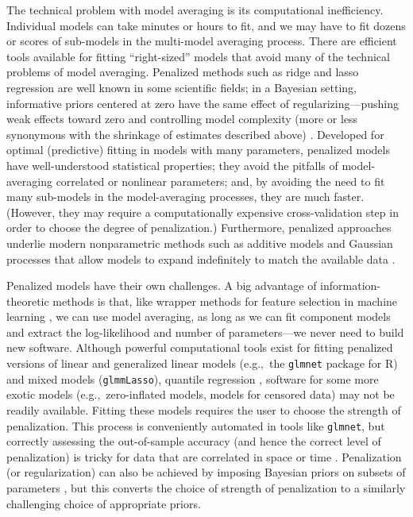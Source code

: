 \documentclass[entropy,article,accept,pdftex,moreauthors]{Definitions/mdpi}
\begin{document}
The technical problem with model averaging is its computational
inefficiency. Individual models can take minutes or hours to fit, and we
may have to fit dozens or scores of sub-models in the multi-model
averaging process. There are efficient tools available for fitting
``right-sized'' models that avoid many of the technical problems of
model averaging. Penalized methods such as ridge and lasso regression
\cite{ref-dahlgren_alternative_2010} are well known in some scientific fields; in a Bayesian
setting, informative priors centered at zero have the same effect of
 regularizing---pushing weak effects toward zero and controlling
model complexity (more or less synonymous with the {shrinkage} of
estimates described above) \cite{ref-lemoineMoving2019a}. Developed for optimal
(predictive) fitting in models with many parameters, penalized models
have well-understood statistical properties; they avoid the pitfalls of
model-averaging correlated or nonlinear parameters; and, by avoiding the
need to fit many sub-models in the model-averaging processes, they are
much faster. (However, they may require a computationally
  expensive cross-validation step in order to choose the degree of
  penalization.) %
Furthermore, penalized approaches underlie modern
nonparametric methods such as additive models and Gaussian processes
that allow models to expand indefinitely to match the available data
\cite{ref-rasmussenGaussian2005,ref-woodGeneralized2017}.

Penalized models have their own challenges. A big advantage of
information-theoretic methods is that, like wrapper methods for feature
selection in machine learning \cite{ref-chandrashekarSurvey2014}, we can use
model averaging, as long as we can fit component models and extract the
log-likelihood and number of parameters---we never need to build new
software. Although powerful computational tools exist for fitting
penalized versions of linear and generalized linear models (e.g.,~the
\texttt{{glmnet}} package for R) and mixed models (\texttt{glmmLasso}),
quantile regression \cite{ref-koenkerQuantile2017}, software for some more exotic models
(e.g.,~zero-inflated models, models for censored data) may not be readily
available. Fitting these models requires the user to choose the strength
of penalization. This process is conveniently automated in tools like
\texttt{glmnet}, but correctly assessing the out-of-sample accuracy (and
hence the correct level of penalization) is tricky for data that are
correlated in space or time \cite{ref-wenger_assessing_2012,ref-robertsCrossvalidation2016}.
Penalization (or regularization) can also be achieved by imposing
Bayesian priors on subsets of parameters \cite{ref-chungNondegenerate2013}, but this
converts the choice of strength of penalization to a similarly
challenging choice of appropriate priors.
\end{document}
